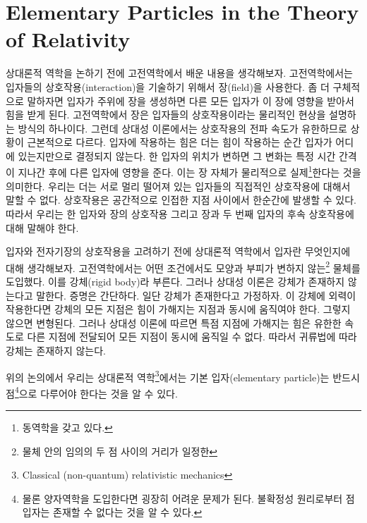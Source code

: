 \section{Elementary Particles in the Theory of Relativity}
\label{sec:05a-01a}

상대론적 역학을 논하기 전에 고전역학에서 배운 내용을 생각해보자. 고전역학에서는 입자들의 상호작용(interaction)을 기술하기 위해서 장(field)을 사용한다. 좀 더 구체적으로 말하자면 입자가 주위에 장을 생성하면 다른 모든 입자가 이 장에 영향을 받아서 힘을 받게 된다. 고전역학에서 장은 입자들의 상호작용이라는 물리적인 현상을 설명하는 방식의 하나이다.
그런데 상대성 이론에서는 상호작용의 전파 속도가 유한하므로 상황이 근본적으로 다르다. 입자에 작용하는 힘은 더는 힘이 작용하는 순간 입자가 어디에 있는지만으로 결정되지 않는다. 한 입자의 위치가 변하면 그 변화는 특정 시간 간격이 지나간 후에 다른 입자에 영향을 준다. 이는 장 자체가 물리적으로 실제\footnote{동역학을 갖고 있다.}한다는 것을 의미한다. 우리는 더는 서로 멀리 떨어져 있는 입자들의 직접적인 상호작용에 대해서 말할 수 없다. 상호작용은 공간적으로 인접한 지점 사이에서 한순간에 발생할 수 있다. 따라서 우리는 한 입자와 장의 상호작용 그리고 장과 두 번째 입자의 후속 상호작용에 대해 말해야 한다.

입자와 전자기장의 상호작용을 고려하기 전에 상대론적 역학에서 입자란 무엇인지에 대해 생각해보자.
고전역학에서는 어떤 조건에서도 모양과 부피가 변하지 않는\footnote{물체 안의 임의의 두 점 사이의 거리가 일정한} 물체를 도입했다. 이를 강체(rigid body)라 부른다. 그러나 상대성 이론은 강체가 존재하지 않는다고 말한다. 증명은 간단하다. 일단 강체가 존재한다고 가정하자. 이 강체에 외력이 작용한다면 강체의 모든 지점은 힘이 가해지는 지점과 동시에 움직여야 한다. 그렇지 않으면 변형된다. 그러나 상대성 이론에 따르면 특점 지점에 가해지는 힘은 유한한 속도로 다른 지점에 전달되어 모든 지점이 동시에 움직일 수 없다. 따라서 귀류법에 따라 강체는 존재하지 않는다.

위의 논의에서 우리는 상대론적 역학\footnote{Classical (non-quantum) relativistic mechanics}에서는 기본 입자(elementary particle)는 반드시 점\footnote{물론 양자역학을 도입한다면 굉장히 어려운 문제가 된다. 불확정성 원리로부터 점 입자는 존재할 수 없다는 것을 알 수 있다.}으로 다루어야 한다는 것을 알 수 있다.
